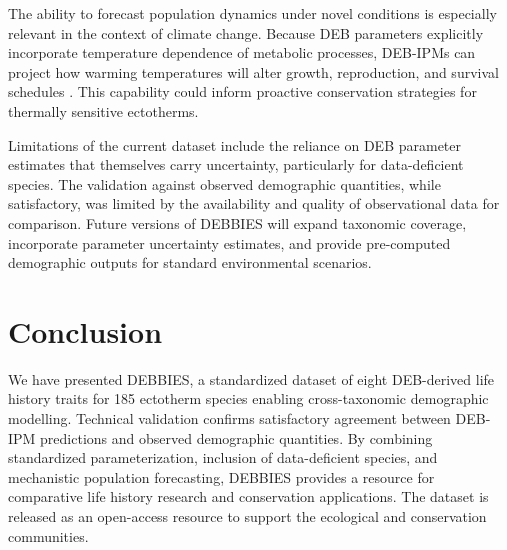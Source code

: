 \documentclass[11pt]{article}
\begin{document}
The ability to forecast population dynamics under novel conditions is especially relevant in the context of climate change. Because DEB parameters explicitly incorporate temperature dependence of metabolic processes, DEB-IPMs can project how warming temperatures will alter growth, reproduction, and survival schedules \citep{kearney2009}. This capability could inform proactive conservation strategies for thermally sensitive ectotherms.

Limitations of the current dataset include the reliance on DEB parameter estimates that themselves carry uncertainty, particularly for data-deficient species. The validation against observed demographic quantities, while satisfactory, was limited by the availability and quality of observational data for comparison. Future versions of DEBBIES will expand taxonomic coverage, incorporate parameter uncertainty estimates, and provide pre-computed demographic outputs for standard environmental scenarios.

\section{Conclusion}

We have presented DEBBIES, a standardized dataset of eight DEB-derived life history traits for 185 ectotherm species enabling cross-taxonomic demographic modelling. Technical validation confirms satisfactory agreement between DEB-IPM predictions and observed demographic quantities. By combining standardized parameterization, inclusion of data-deficient species, and mechanistic population forecasting, DEBBIES provides a resource for comparative life history research and conservation applications. The dataset is released as an open-access resource to support the ecological and conservation communities.



\end{document}
